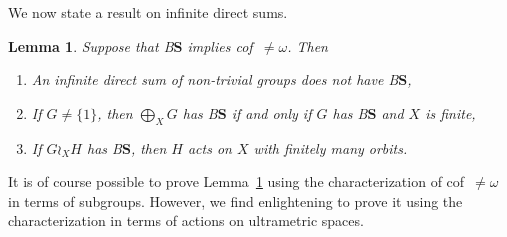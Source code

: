 \documentclass[a4paper]{article}
\newtheorem{lem}{Lemma}[section]
\theoremstyle{definition}
\newcommand*{\BS}{B$\mathbf{S}$}
\begin{document}
We now state a result on infinite direct sums.
%
%
\begin{lem}\label{Lemma:Cof}
Suppose that \BS{} implies cof~$\neq\omega$. Then
\begin{enumerate}
\item An infinite direct sum of non-trivial groups does not have \BS,
\item If $G\neq\{1\}$, then $\bigoplus_XG$ has \BS{} if and only if $G$ has \BS{} and $X$ is finite,
\item If $G\wr_XH$ has \BS, then $H$ acts on $X$ with finitely many orbits.
\end{enumerate}
\end{lem}
%
%
It is of course possible to prove Lemma~\ref{Lemma:Cof} using the characterization of cof~$\neq\omega$ in terms of subgroups. However, we find enlightening to prove it using the characterization in terms of actions on ultrametric spaces.
%
%
\end{document}
